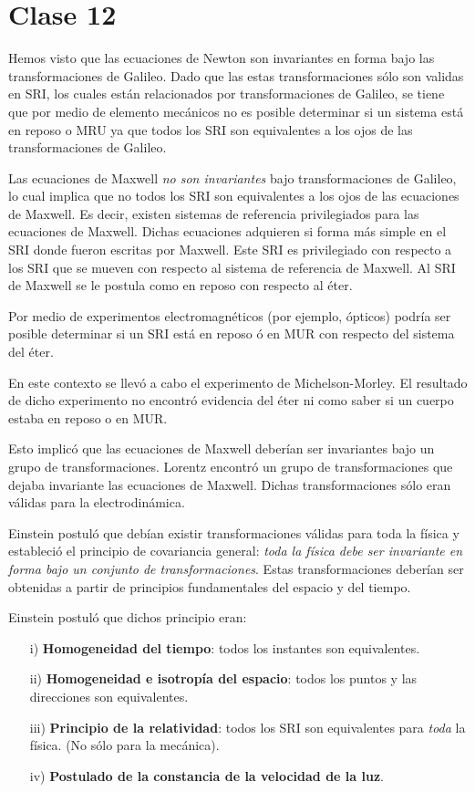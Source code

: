 \section{Clase 12}
Hemos visto que las ecuaciones de Newton son invariantes en forma bajo las transformaciones de Galileo. Dado que las estas transformaciones sólo son validas en SRI, los cuales están relacionados por transformaciones de Galileo, se tiene que por medio de elemento mecánicos no es posible determinar si un sistema está en reposo o MRU ya que todos los SRI son equivalentes a los ojos de las transformaciones de Galileo.

Las ecuaciones de Maxwell \textit{no son invariantes} bajo transformaciones de Galileo, lo cual implica que no todos los SRI son equivalentes a los ojos de las ecuaciones de Maxwell. Es decir, existen sistemas de referencia privilegiados para las ecuaciones de Maxwell. Dichas ecuaciones adquieren si forma más simple en el SRI donde fueron escritas por Maxwell. Este SRI es privilegiado con respecto a los SRI que se mueven con respecto al sistema de referencia de Maxwell. Al SRI de Maxwell se le postula como en reposo con respecto al éter.

Por medio de experimentos electromagnéticos (por ejemplo, ópticos) podría ser posible determinar si un SRI está en reposo ó en MUR con respecto del sistema del éter.

En este contexto se llevó a cabo el experimento de Michelson-Morley. El resultado de dicho experimento no encontró evidencia del éter ni como saber si un cuerpo estaba en reposo o en MUR.

 Esto implicó que las ecuaciones de Maxwell deberían ser invariantes bajo un grupo de transformaciones. Lorentz encontró un grupo de transformaciones que dejaba invariante las ecuaciones de Maxwell. Dichas transformaciones sólo eran válidas para la electrodinámica.
 
 Einstein postuló que debían existir transformaciones válidas para toda la física y estableció el principio de covariancia general: \textit{toda la física debe ser invariante en forma bajo un conjunto de transformaciones}. Estas transformaciones deberían ser obtenidas a partir de principios fundamentales del espacio y del tiempo.
 
 Einstein postuló que dichos principio eran:
 \begin{enumerate}
 	\item[i)] \textbf{Homogeneidad del tiempo}: todos los instantes son equivalentes.
 	\item[ii)] \textbf{Homogeneidad e isotropía del espacio}: todos los puntos y las direcciones son equivalentes.
 	\item[iii)] \textbf{Principio de la relatividad}: todos los SRI son equivalentes para \textit{toda} la física. (No sólo para la mecánica).
 	\item[iv)] \textbf{Postulado de la constancia de la velocidad de la luz}.
 \end{enumerate}
 
